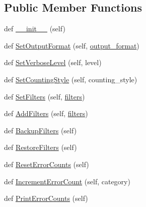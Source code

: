 \subsection*{Public Member Functions}
\begin{DoxyCompactItemize}
\item 
def \hyperlink{classcpplint_1_1__CppLintState_a9cc2db6b8d2e3b757fc48fb3c2fd4d8b}{\+\_\+\+\_\+init\+\_\+\+\_\+} (self)
\item 
def \hyperlink{classcpplint_1_1__CppLintState_ab43553d2e2027b58d08a7001c71c0902}{Set\+Output\+Format} (self, \hyperlink{classcpplint_1_1__CppLintState_a5c68ca79b0ff9b2fba1c488a7b2bd3f0}{output\+\_\+format})
\item 
def \hyperlink{classcpplint_1_1__CppLintState_ad4f97c907cc79e8d60237d0327830588}{Set\+Verbose\+Level} (self, level)
\item 
def \hyperlink{classcpplint_1_1__CppLintState_ac2503f2d8a357edd3ca648d219c7317e}{Set\+Counting\+Style} (self, counting\+\_\+style)
\item 
def \hyperlink{classcpplint_1_1__CppLintState_a359d4516eac0c1dce6223cf18181ac80}{Set\+Filters} (self, \hyperlink{classcpplint_1_1__CppLintState_a8443105b9623383ab75fa242009c006e}{filters})
\item 
def \hyperlink{classcpplint_1_1__CppLintState_a248c70895572f2468d3c842faff2f285}{Add\+Filters} (self, \hyperlink{classcpplint_1_1__CppLintState_a8443105b9623383ab75fa242009c006e}{filters})
\item 
def \hyperlink{classcpplint_1_1__CppLintState_a2444e784910e03681de22f43d4077dd1}{Backup\+Filters} (self)
\item 
def \hyperlink{classcpplint_1_1__CppLintState_a7a9c9fdfe033ebe1933450b4ae524598}{Restore\+Filters} (self)
\item 
def \hyperlink{classcpplint_1_1__CppLintState_ab802596abd5fba5e290e090388b6842a}{Reset\+Error\+Counts} (self)
\item 
def \hyperlink{classcpplint_1_1__CppLintState_a27a33a5049850d52cc8aef3478ca445a}{Increment\+Error\+Count} (self, category)
\item 
def \hyperlink{classcpplint_1_1__CppLintState_a3149156b00f8d53e5625256e3df2b4f0}{Print\+Error\+Counts} (self)
\end{DoxyCompactItemize}
